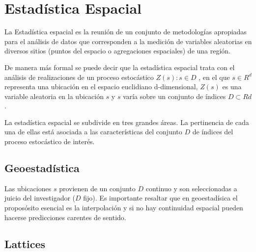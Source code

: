 \section{Estadística Espacial}

La Estadística espacial es la reunión de un conjunto de metodologías apropiadas para el
análisis de datos que corresponden a la medición de variables aleatorias en diversos sitios
(puntos del espacio o agregaciones espaciales) de una región. 

De manera más formal se puede decir que la estadística espacial trata con el análisis de 
realizaciones de un proceso estocástico ${ Z ( s ) : s \in D }$ , en el que $s \in R^d$ representa 
una ubicación en el espacio euclidiano d-dimensional, $Z(s)$ es una variable aleatoria en
la ubicación $s$ y $s$ varía sobre un conjunto de índices $D \subset R d$. \cite{giraldo}

La estadística espacial se subdivide en tres grandes áreas. La pertinencia de cada una
de ellas está asociada a las características del conjunto $D$ de índices del proceso estocástico
de interés. \cite{giraldo}

\subsection{Geoestadística}

Las ubicaciones $s$ provienen de un conjunto $D$ continuo  y son seleccionadas
a juicio del investigador ($D$ fijo). Es importante resaltar que en geoestadísica el proposósito esencial es la interpolación y si no hay continuidad espacial pueden hacerse predicciones carentes de sentido.  

\subsection{Lattices} 
